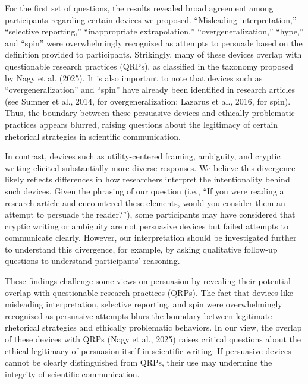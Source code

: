 \documentclass[authordate, meta]{jote-new-article}
\begin{document}
	For the first set of questions, the results revealed broad agreement among participants regarding certain devices we proposed. “Misleading interpretation,” “selective reporting,” “inappropriate extrapolation,” “overgeneralization,” “hype,” and “spin” were overwhelmingly recognized as attempts to persuade based on the definition provided to participants. Strikingly, many of these devices overlap with questionable research practices (QRPs), as classified in the taxonomy proposed by Nagy et al. (2025). It is also important to note that devices such as “overgeneralization” and “spin” have already been identified in research articles (see Sumner et al., 2014, for overgeneralization; Lazarus et al., 2016, for spin). Thus, the boundary between these persuasive devices and ethically problematic practices appears blurred, raising questions about the legitimacy of certain rhetorical strategies in scientific communication.



	In contrast, devices such as utility-centered framing, ambiguity, and cryptic writing elicited substantially more diverse responses. We believe this divergence likely reflects differences in how researchers interpret the intentionality behind such devices. Given the phrasing of our question (i.e., “If you were reading a research article and encountered these elements, would you consider them an attempt to persuade the reader?”), some participants may have considered that cryptic writing or ambiguity are not persuasive devices but failed attempts to communicate clearly. However, our interpretation should be investigated further to understand this divergence, for example, by asking qualitative follow-up questions to understand participants' reasoning.



	These findings challenge some views on persuasion by revealing their potential overlap with questionable research practices (QRPs). The fact that devices like misleading interpretation, selective reporting, and spin were overwhelmingly recognized as persuasive attempts blurs the boundary between legitimate rhetorical strategies and ethically problematic behaviors. In our view, the overlap of these devices with QRPs (Nagy et al., 2025) raises critical questions about the ethical legitimacy of persuasion itself in scientific writing: If persuasive devices cannot be clearly distinguished from QRPs, their use may undermine the integrity of scientific communication.
\end{document}
